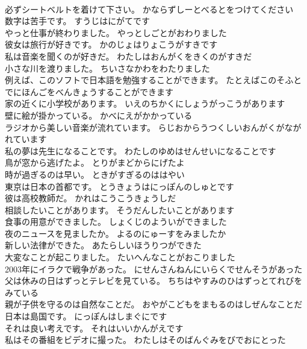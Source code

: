 \documentclass[8pt]{extreport}
\begin{document}
\begin{CJK}{UTF8}{min}
\\	必ずシートベルトを着けて下さい。	かならずしーとべるとをつけてください 
\\	数字は苦手です。	すうじはにがてです 
\\	やっと仕事が終わりました。	やっとしごとがおわりました 
\\	彼女は旅行が好きです。	かのじょはりょこうがすきです 
\\	私は音楽を聞くのが好きだ。	わたしはおんがくをきくのがすきだ 
\\	小さな川を渡りました。	ちいさなかわをわたりました 
\\	例えば、このソフトで日本語を勉強することができます。	たとえばこのそふとでにほんごをべんきょうすることができます 
\\	家の近くに小学校があります。	いえのちかくにしょうがっこうがあります 
\\	壁に絵が掛かっている。	かべにえがかかっている 
\\	ラジオから美しい音楽が流れています。	らじおからうつくしいおんがくがながれています 
\\	私の夢は先生になることです。	わたしのゆめはせんせいになることです 
\\	鳥が窓から逃げたよ。	とりがまどからにげたよ 
\\	時が過ぎるのは早い。	ときがすぎるのははやい 
\\	東京は日本の首都です。	とうきょうはにっぽんのしゅとです 
\\	彼は高校教師だ。	かれはこうこうきょうしだ 
\\	相談したいことがあります。	そうだんしたいことがあります 
\\	食事の用意ができました。	しょくじのよういができました 
\\	夜のニュースを見ましたか。	よるのにゅーすをみましたか 
\\	新しい法律ができた。	あたらしいほうりつができた 
\\	大変なことが起こりました。	たいへんなことがおこりました 
\\	2003年にイラクで戦争があった。	にせんさんねんにいらくでせんそうがあった 
\\	父は休みの日はずっとテレビを見ている。	ちちはやすみのひはずっとてれびをみている 
\\	親が子供を守るのは自然なことだ。	おやがこどもをまもるのはしぜんなことだ 
\\	日本は島国です。	にっぽんはしまぐにです 
\\	それは良い考えです。	それはいいかんがえです 
\\	私はその番組をビデオに撮った。	わたしはそのばんぐみをびでおにとった 

\end{CJK}
\end{document}
